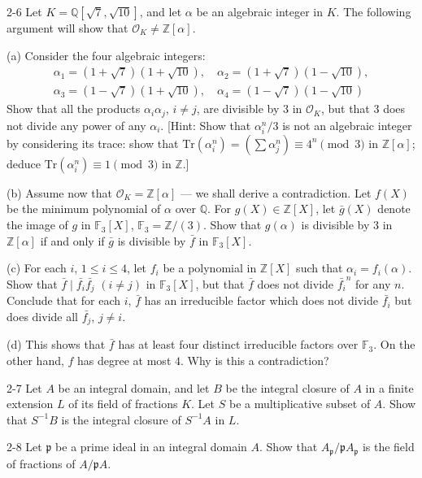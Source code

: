 \documentclass[12pt]{amsart}
\begin{document}
\begin{exercise}{2-6}
Let $K=\mathbb{Q}[\sqrt{7},\sqrt{10}]$, and let $\alpha$ be an algebraic integer in $K$. The following argument will show that $\mathcal{O}_K\neq \mathbb{Z}[\alpha]$.

(a) Consider the four algebraic integers:
\begin{align*}
    \alpha_1=(1+\sqrt{7})(1+\sqrt{10}),\quad
    \alpha_2=(1+\sqrt{7})(1-\sqrt{10}), \\
    \alpha_3=(1-\sqrt{7})(1+\sqrt{10}),\quad
    \alpha_4=(1-\sqrt{7})(1-\sqrt{10})    
\end{align*}
Show that all the products $\alpha_i\alpha_j$, $i\neq j$, are divisible by $3$ in $\mathcal{O}_K$, but that $3$ does not divide any power of any $\alpha_i$. [Hint: Show that $\alpha_i^n/3$ is not an algebraic integer by considering its trace: show that $\mathrm{Tr}(\alpha_i^n)=\left(\sum \alpha_j^n\right)\equiv 4^n\pmod{3}$ in $\mathbb{Z}[\alpha]$; deduce $\mathrm{Tr}(\alpha_i^n)\equiv 1\pmod{3}$ in $\mathbb{Z}$.]

(b) Assume now that $\mathcal{O}_K=\mathbb{Z}[\alpha]$ — we shall derive a contradiction. Let $f(X)$ be the minimum polynomial of $\alpha$ over $\mathbb{Q}$. For $g(X)\in \mathbb{Z}[X]$, let $\bar{g}(X)$ denote the image of $g$ in $\mathbb{F}_3[X]$, $\mathbb{F}_3=\mathbb{Z}/(3)$. Show that $g(\alpha)$ is divisible by $3$ in $\mathbb{Z}[\alpha]$ if and only if $\bar{g}$ is divisible by $\bar{f}$ in $\mathbb{F}_3[X]$.

(c) For each $i$, $1\leq i\leq 4$, let $f_i$ be a polynomial in $\mathbb{Z}[X]$ such that $\alpha_i=f_i(\alpha)$. Show that $\bar{f}\mid \bar{f_i}\bar{f_j}$ $(i\neq j)$ in $\mathbb{F}_3[X]$, but that $\bar{f}$ does not divide $\bar{f_i}^n$ for any $n$. Conclude that for each $i$, $\bar{f}$ has an irreducible factor which does not divide $\bar{f_i}$ but does divide all $\bar{f_j}$, $j\neq i$.

(d) This shows that $\bar{f}$ has at least four distinct irreducible factors over $\mathbb{F}_3$. On the other hand, $f$ has degree at most $4$. Why is this a contradiction?
\end{exercise}

\begin{exercise}{2-7}
Let $A$ be an integral domain, and let $B$ be the integral closure of $A$ in a finite extension $L$ of its field of fractions $K$. Let $S$ be a multiplicative subset of $A$. Show that $S^{-1}B$ is the integral closure of $S^{-1}A$ in $L$.
\end{exercise}

\begin{exercise}{2-8}
Let $\mathfrak{p}$ be a prime ideal in an integral domain $A$. Show that $A_{\mathfrak{p}}/\mathfrak{p}A_{\mathfrak{p}}$ is the field of fractions of $A/\mathfrak{p}A$.
\end{exercise}
\end{document}
